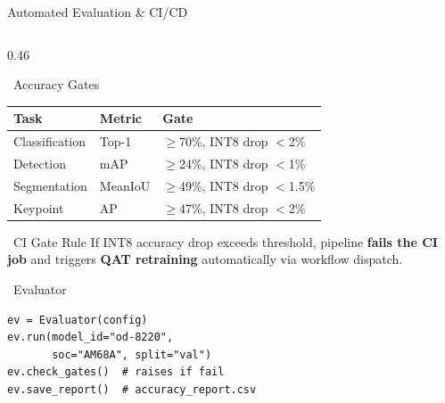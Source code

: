 \documentclass[aspectratio=169,12pt]{beamer}
\begin{document}
\begin{frame}{Automated Evaluation \& CI/CD}
  \begin{columns}[T]
    \begin{column}{0.46\textwidth}
      \begin{block}{\faCheckCircle~Accuracy Gates}
        \scriptsize
        \begin{tabular}{p{2.0cm}p{1.5cm}p{2.0cm}}
          \toprule
          \textbf{Task} & \textbf{Metric} & \textbf{Gate} \\
          \midrule
          \rowcolor{TIGray}
          Classification & Top-1 & $\geq$70\%, INT8 drop $<$2\% \\
          Detection & mAP & $\geq$24\%, INT8 drop $<$1\% \\
          \rowcolor{TIGray}
          Segmentation & MeanIoU & $\geq$49\%, INT8 drop $<$1.5\% \\
          Keypoint & AP & $\geq$47\%, INT8 drop $<$2\% \\
          \bottomrule
        \end{tabular}
      \end{block}
      \vspace{0.2cm}
      \begin{alertblock}{\scriptsize \faExclamationTriangle~CI Gate Rule}
        \scriptsize If INT8 accuracy drop exceeds threshold,
        pipeline \textbf{fails the CI job} and triggers
        \textbf{QAT retraining} automatically via workflow dispatch.
      \end{alertblock}
      \vspace{0.2cm}
      \begin{exampleblock}{\scriptsize \faPython~Evaluator}
        \begin{lstlisting}
ev = Evaluator(config)
ev.run(model_id="od-8220",
       soc="AM68A", split="val")
ev.check_gates()  # raises if fail
ev.save_report()  # accuracy_report.csv
        \end{lstlisting}
      \end{exampleblock}
    \end{column}


\end{columns}
\end{frame}
\end{document}
